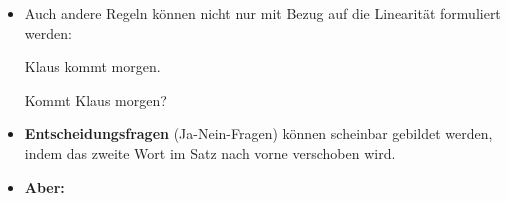 \begin{frame}

\begin{itemize}
	\item Auch andere Regeln können nicht nur mit Bezug auf die Linearität formuliert werden:
	
	\settowidth{\textwidth}{Entscheidungsfrage}
	\ea Klaus kommt morgen. 
	\z

	\ea Kommt Klaus morgen? 
	\z
	
	\item \textbf{Entscheidungsfragen} (Ja-Nein-Fragen) können scheinbar gebildet werden, indem das zweite Wort im Satz nach vorne verschoben wird.\\

\pause
	
	\item[] \textbf{Aber:}
	
	

\z
	
\end{itemize}

\end{frame}


